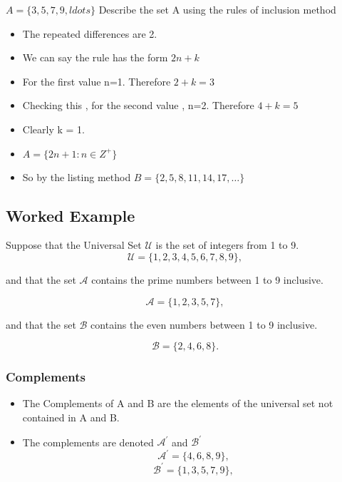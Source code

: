 $A = \{3,5,7,9,ldots \}$
Describe the set A using the rules of inclusion method

\begin{itemize}
\item The repeated differences are 2.
\item We can say the rule has the form $2n+k$
\item For the first value n=1. Therefore $2+k=3$
\item Checking this , for the second value , n=2. Therefore $4+k=5$
\item Clearly k = 1.
\item $A = \{2n+1 :n \in Z^{+} \}$
\item So by the listing method $B= \{2,5,8,11,14,17,\ldots\}$
\end{itemize}





\subsection*{Worked Example}

Suppose that the Universal Set $\mathcal{U}$ is the set of integers from 1 to 9.
\[ \mathcal{U} = \{1,2,3,4,5,6,7,8,9\}, \]

and that the set $\mathcal{A}$ contains the prime numbers between 1 to 9 inclusive.

\[ \mathcal{A} = \{1,2,3,5,7\}, \]

and that the set $\mathcal{B}$ contains the even numbers between 1 to 9 inclusive.

\[ \mathcal{B} = \{2,4,6,8\}. \]

\subsubsection*{Complements}
\begin{itemize}

\item The Complements of A and B are the elements of the universal set not contained in A and B.

\item The complements are denoted $\mathcal{A}^{\prime}$ and $\mathcal{B}^{\prime}$
\[ \mathcal{A}^{\prime} = \{4,6,8,9\}, \]
\[ \mathcal{B}^{\prime} = \{1,3,5,7,9\}, \]

\end{itemize}


